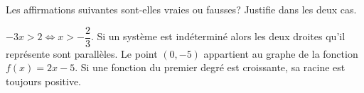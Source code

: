 %
%
    Les affirmations suivantes sont-elles vraies ou fausses? Justifie dans les deux cas.
    \begin{tasks}
        \task \(-3x > 2 \Leftrightarrow x > -\dfrac{2}{3}\).
        \task Si un système est indéterminé alors les deux droites qu'il représente sont parallèles.
        \task Le point $(0,-5)$ appartient au graphe de la fonction $f(x)=2x -5$.
        \task Si une fonction du premier degré est croissante, sa racine est toujours positive.
    \end{tasks}
